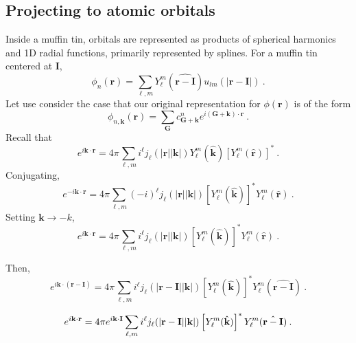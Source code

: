 \subsection{Projecting to atomic orbitals}


\renewcommand{\vr}{\mathbf{r}}
\newcommand{\vI}{\mathbf{I}}
\renewcommand{\vk}{\mathbf{k}}
\newcommand{\vG}{\mathbf{G}}

Inside a muffin tin, orbitals are represented as products of spherical
harmonics and 1D radial functions, primarily represented by splines.
For a muffin tin centered at $\vI$, 
\begin{equation}
\phi_n(\vr) = \sum_{\ell,m} Y_\ell^m(\hat{\vr -\vI})
u_{lm}\left(\left|\vr - \vI\right|\right) \label{eq:ulm}\:.
\end{equation}
Let use consider the case that our original representation for
$\phi(\vr)$ is of the form
\begin{equation}
\phi_{n,\vk}(\vr) = \sum_\vG c_{\vG+\vk}^n e^{i(\vG + \vk)\cdot \vr}\:.
\end{equation}
Recall that
\begin{equation}
e^{i\vk\cdot\vr} = 4\pi \sum_{\ell,m} i^\ell j_\ell(|\vr||\vk|)
Y_\ell^m(\hat{\vk}) \left[Y_\ell^m(\hat{\vr})\right]^*\:.
\end{equation}
Conjugating,
\begin{equation}
e^{-i\vk\cdot\vr} = 4\pi\sum_{\ell,m} (-i)^\ell j_\ell(|\vr||\vk|)
\left[Y_\ell^m(\hat{\vk})\right]^* Y_\ell^m(\hat{\vr})\:.
\end{equation}
Setting $\vk \rightarrow -k$,
\begin{equation}
e^{i\vk\cdot\vr} = 4\pi\sum_{\ell,m} i^\ell j_\ell(|\vr||\vk|)
\left[Y_\ell^m(\hat{\vk})\right]^* Y_\ell^m(\hat{\vr})\:.
\end{equation}

Then,
\begin{equation}
e^{i\vk\cdot(\vr-\vI)} = 4\pi\sum_{\ell,m} i^\ell j_\ell(|\vr-\vI||\vk|)
\left[Y_\ell^m(\hat{\vk})\right]^* Y_\ell^m(\hat{\vr-\vI})\:.
\end{equation}

\begin{equation}
e^{i\vk\cdot\vr} = 4\pi e^{i\vk\cdot\vI} \-\sum_{\ell,m} i^\ell j_\ell(|\vr-\vI||\vk|)
\left[Y_\ell^m(\hat{\vk})\right]^* Y_\ell^m(\hat{\vr-\vI})\:.
\end{equation}

